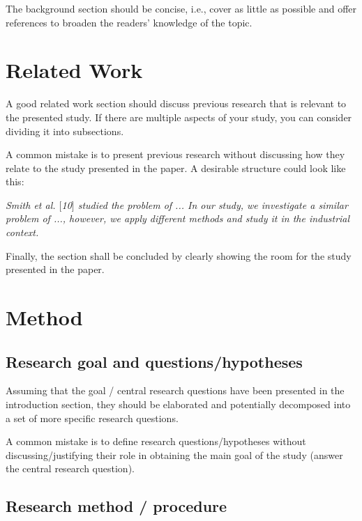 \documentclass[]{einformatica}
\begin{document}
The background section should be concise, i.e., cover as little as possible and offer references to broaden the readers' knowledge of the topic. 

\section{Related Work}\label{sec:RelatedWork}

A good related work section should discuss previous research that is relevant to the presented study. If there are multiple aspects of your study, you can consider dividing it into subsections.

A common mistake is to present previous research without discussing how they relate to the study presented in the paper. A desirable structure could look like this: 
\vspace{12pt}

\textit{Smith et al. $[$10$]$ studied the problem of ... In our study, we investigate a similar problem of ..., however, we apply different methods and study it in the industrial context.}

\vspace{12pt}
Finally, the section shall be concluded by clearly showing the room for the study presented in the paper.

\section{Method}\label{sec:Method}
\subsection*{Research goal and questions/hypotheses}

Assuming that the goal / central research questions have been presented in the introduction section, they should be elaborated and potentially decomposed into a set of more specific research questions. 

A common mistake is to define research questions/hypotheses without discussing/justifying their role in obtaining the main goal of the study (answer the central research question). 

\subsection*{Research method / procedure}
\end{document}
